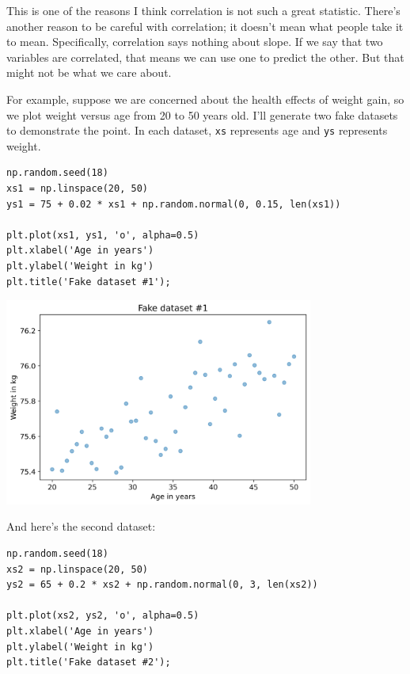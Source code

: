 This is one of the reasons I think correlation is not such a great
statistic. There's another reason to be careful with correlation; it
doesn't mean what people take it to mean. Specifically, correlation says
nothing about slope. If we say that two variables are correlated, that
means we can use one to predict the other. But that might not be what we
care about.

For example, suppose we are concerned about the health effects of weight
gain, so we plot weight versus age from 20 to 50 years old. I'll
generate two fake datasets to demonstrate the point. In each dataset,
\passthrough{\lstinline!xs!} represents age and
\passthrough{\lstinline!ys!} represents weight.

\begin{lstlisting}[]
np.random.seed(18)
xs1 = np.linspace(20, 50)
ys1 = 75 + 0.02 * xs1 + np.random.normal(0, 0.15, len(xs1))

plt.plot(xs1, ys1, 'o', alpha=0.5)
plt.xlabel('Age in years')
plt.ylabel('Weight in kg')
plt.title('Fake dataset #1');
\end{lstlisting}

\begin{center}
\includegraphics[width=4in]{chapters/09_relationships_files/09_relationships_66_0.png}
\end{center}

And here's the second dataset:

\begin{lstlisting}[]
np.random.seed(18)
xs2 = np.linspace(20, 50)
ys2 = 65 + 0.2 * xs2 + np.random.normal(0, 3, len(xs2))

plt.plot(xs2, ys2, 'o', alpha=0.5)
plt.xlabel('Age in years')
plt.ylabel('Weight in kg')
plt.title('Fake dataset #2');
\end{lstlisting}

